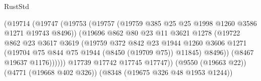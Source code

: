 \begin{lexlean}{RustStd}
\begin{coremodule}
                                    (@19714
                                      (@19747
                                        (@19753
                                          (@19757
                                            (@19759
                                              @385
                                              @25
                                              @25
                                              @1998
                                              @1260
                                              @3586
                                              @1271
                                              @19743
                                              @8496))
                                          (@19696
                                            @862
                                            @80
                                            @23
                                            @11
                                            @3621
                                            @1278
                                            (@19722
                                              @862
                                              @23
                                              @3617
                                              @3619
                                              (@19759
                                                @372
                                                @842
                                                @23
                                                @1944
                                                @1260
                                                @3606
                                                @1271
                                                (@19704
                                                  @75
                                                  @844
                                                  @75
                                                  @1944
                                                  (@8450 (@19709 @75))
                                                  @11845)
                                                @8496))
                                            (@8467 @19637 @1176))))))
                                  @17739
                                  @17742
                                  @17745
                                  @17747))
                              (@9550 (@19663 @22))
                              (@4771 (@19668 @402 @326))
                              (@8348 (@19675 @326 @48 @1953 @1244))

\end{coremodule}
\end{lexlean}
